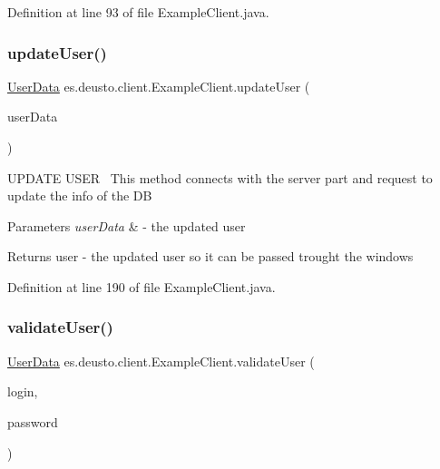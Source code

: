 Definition at line 93 of file Example\+Client.\+java.

\mbox{\label{classes_1_1deusto_1_1client_1_1_example_client_afbee30635a2cfe7fb7cfc58393b40bfb}} 
\subsubsection{\texorpdfstring{update\+User()}{updateUser()}}
{\footnotesize\ttfamily \hyperlink{classes_1_1deusto_1_1serialization_1_1_user_data}{User\+Data} es.\+deusto.\+client.\+Example\+Client.\+update\+User (\begin{DoxyParamCaption}\item[{\hyperlink{classes_1_1deusto_1_1serialization_1_1_user_data}{User\+Data}}]{user\+Data }\end{DoxyParamCaption})}

U\+P\+D\+A\+TE U\+S\+ER~\newline
This method connects with the server part and request to update the info of the DB 
\begin{DoxyParams}{Parameters}
{\em user\+Data} & -\/ the updated user \\
\hline
\end{DoxyParams}
\begin{DoxyReturn}{Returns}
user -\/ the updated user so it can be passed trought the windows 
\end{DoxyReturn}


Definition at line 190 of file Example\+Client.\+java.

\mbox{\label{classes_1_1deusto_1_1client_1_1_example_client_a740fa7000d0cd30603ce100b299ba8ba}} 
\subsubsection{\texorpdfstring{validate\+User()}{validateUser()}}
{\footnotesize\ttfamily \hyperlink{classes_1_1deusto_1_1serialization_1_1_user_data}{User\+Data} es.\+deusto.\+client.\+Example\+Client.\+validate\+User (\begin{DoxyParamCaption}\item[{String}]{login,  }\item[{String}]{password }\end{DoxyParamCaption})}


